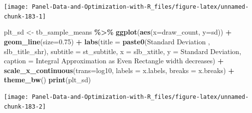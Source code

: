 \documentclass[
]{book}
\newenvironment{Shaded}{\begin{snugshade}}{\end{snugshade}}
\newcommand{\DataTypeTok}[1]{\textcolor[rgb]{0.13,0.29,0.53}{#1}}
\newcommand{\FloatTok}[1]{\textcolor[rgb]{0.00,0.00,0.81}{#1}}
\newcommand{\KeywordTok}[1]{\textcolor[rgb]{0.13,0.29,0.53}{\textbf{#1}}}
\newcommand{\NormalTok}[1]{#1}
\newcommand{\OperatorTok}[1]{\textcolor[rgb]{0.81,0.36,0.00}{\textbf{#1}}}
\newcommand{\StringTok}[1]{\textcolor[rgb]{0.31,0.60,0.02}{#1}}
\begin{document}
\begin{center}\texttt{[image: Panel-Data-and-Optimization-with-R\_files/figure-latex/unnamed-chunk-183-1]} \end{center}

\begin{Shaded}
\begin{Highlighting}[]
\NormalTok{plt\_sd \textless{}{-}}\StringTok{ }\NormalTok{tb\_sample\_means }\OperatorTok{\%\textgreater{}\%}
\StringTok{  }\KeywordTok{ggplot}\NormalTok{(}\KeywordTok{aes}\NormalTok{(}\DataTypeTok{x=}\NormalTok{draw\_count, }\DataTypeTok{y=}\NormalTok{sd)) }\OperatorTok{+}
\StringTok{  }\KeywordTok{geom\_line}\NormalTok{(}\DataTypeTok{size=}\FloatTok{0.75}\NormalTok{) }\OperatorTok{+}
\StringTok{  }\KeywordTok{labs}\NormalTok{(}\DataTypeTok{title =} \KeywordTok{paste0}\NormalTok{(}\StringTok{\textquotesingle{}Standard Deviation \textquotesingle{}}\NormalTok{, slb\_title\_shr),}
       \DataTypeTok{subtitle =}\NormalTok{ st\_subtitle,}
       \DataTypeTok{x =}\NormalTok{ slb\_xtitle,}
       \DataTypeTok{y =} \StringTok{\textquotesingle{}Standard Deviation\textquotesingle{}}\NormalTok{,}
       \DataTypeTok{caption =} \StringTok{\textquotesingle{}Integral Approximation as Even Rectangle width decreases\textquotesingle{}}\NormalTok{) }\OperatorTok{+}
\StringTok{  }\KeywordTok{scale\_x\_continuous}\NormalTok{(}\DataTypeTok{trans=}\StringTok{\textquotesingle{}log10\textquotesingle{}}\NormalTok{, }\DataTypeTok{labels =}\NormalTok{ x.labels, }\DataTypeTok{breaks =}\NormalTok{ x.breaks) }\OperatorTok{+}
\StringTok{  }\KeywordTok{theme\_bw}\NormalTok{()}
\KeywordTok{print}\NormalTok{(plt\_sd)}
\end{Highlighting}
\end{Shaded}

\begin{center}\texttt{[image: Panel-Data-and-Optimization-with-R\_files/figure-latex/unnamed-chunk-183-2]} \end{center}
\end{document}
